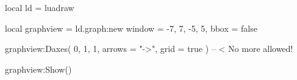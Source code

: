 \documentclass[border = 3pt]{standalone}
\begin{document}
\begin{luadraw*}{}
local ld = luadraw

local graphview = ld.graph:new{
  window = {-7, 7, -5, 5},
  bbox   = false
}

graphview:Daxes(
  {0, 1, 1},
  {
    arrows = "->",
    grid   = true
  }
)  -- < No more allowed!

graphview:Show()
\end{luadraw*}
\end{document}
